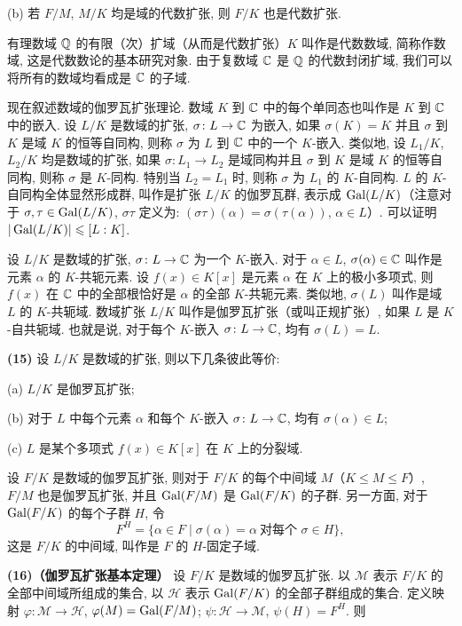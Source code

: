 (b) 若 $F/M$, $M/K$ 均是域的代数扩张, 则 $F/K$ 也是代数扩张.

有理数域 $\mathbb{Q}$ 的有限（次）扩域（从而是代数扩张）$K$ 叫作是代数数域, 简称作数域, 这是代数数论的基本研究对象. 由于复数域 $\mathbb{C}$ 是 $\mathbb{Q}$ 的代数封闭扩域, 我们可以将所有的数域均看成是 $\mathbb{C}$ 的子域.

现在叙述数域的伽罗瓦扩张理论. 数域 $K$ 到 $\mathbb{C}$ 中的每个单同态也叫作是 $K$ 到 $\mathbb{C}$ 中的嵌入. 设 $L/K$ 是数域的扩张, $\sigma\colon L\to\mathbb{C}$ 为嵌入, 如果 $\sigma(K)=K$ 并且 $\sigma$ 到 $K$ 是域 $K$ 的恒等自同构, 则称 $\sigma$ 为 $L$ 到 $\mathbb{C}$ 中的一个 $K$-嵌入. 类似地, 设 $L_1/K$, $L_2/K$ 均是数域的扩张, 如果 $\sigma\colon L_1\to L_2$ 是域同构并且 $\sigma$ 到 $K$ 是域 $K$ 的恒等自同构, 则称 $\sigma$ 是 $K$-同构. 特别当 $L_2=L_1$ 时, 则称 $\sigma$ 为 $L_1$ 的 $K$-自同构. $L$ 的 $K$-自同构全体显然形成群, 叫作是扩张 $L/K$ 的伽罗瓦群, 表示成 $\operatorname{Gal}(L/K)$（注意对于 $\sigma,\tau\in\operatorname{Gal}(L/K)$, $\sigma\tau$ 定义为: $(\sigma\tau)(\alpha)=\sigma(\tau(\alpha))$, $\alpha\in L$）. 可以证明 $|\operatorname{Gal}(L/K)|\leqslant[L:K]$.

设 $L/K$ 是数域的扩张, $\sigma\colon L\to\mathbb{C}$ 为一个 $K$-嵌入. 对于 $\alpha\in L$, $\sigma(\alpha)\in\mathbb{C}$ 叫作是元素 $\alpha$ 的 $K$-共轭元素. 设 $f(x)\in K[x]$ 是元素 $\alpha$ 在 $K$ 上的极小多项式, 则 $f(x)$ 在 $\mathbb{C}$ 中的全部根恰好是 $\alpha$ 的全部 $K$-共轭元素. 类似地, $\sigma(L)$ 叫作是域 $L$ 的 $K$-共轭域. 数域扩张 $L/K$ 叫作是伽罗瓦扩张（或叫正规扩张）, 如果 $L$ 是 $K$-自共轭域. 也就是说, 对于每个 $K$-嵌入 $\sigma\colon L\to\mathbb{C}$, 均有 $\sigma(L)=L$.

\textbf{(15)} 设 $L/K$ 是数域的扩张, 则以下几条彼此等价:

(a) $L/K$ 是伽罗瓦扩张;

(b) 对于 $L$ 中每个元素 $\alpha$ 和每个 $K$-嵌入 $\sigma\colon L\to\mathbb{C}$, 均有 $\sigma(\alpha)\in L$;

(c) $L$ 是某个多项式 $f(x)\in K[x]$ 在 $K$ 上的分裂域.

设 $F/K$ 是数域的伽罗瓦扩张, 则对于 $F/K$ 的每个中间域 $M$（$K\leqslant M\leqslant F$）, $F/M$ 也是伽罗瓦扩张, 并且 $\operatorname{Gal}(F/M)$ 是 $\operatorname{Gal}(F/K)$ 的子群. 另一方面, 对于 $\operatorname{Gal}(F/K)$ 的每个子群 $H$, 令
\[
  F^H=\{\alpha\in F\mid\sigma(\alpha)=\alpha\ \text{对每个 } \sigma\in H\},
\]
这是 $F/K$ 的中间域, 叫作是 $F$ 的 $H$-固定子域.

\textbf{(16)（伽罗瓦扩张基本定理）} 设 $F/K$ 是数域的伽罗瓦扩张. 以 $\mathcal{M}$ 表示 $F/K$ 的全部中间域所组成的集合, 以 $\mathcal{H}$ 表示 $\operatorname{Gal}(F/K)$ 的全部子群组成的集合. 定义映射 $\varphi\colon\mathcal{M}\to\mathcal{H}$, $\varphi(M)=\operatorname{Gal}(F/M)$; $\psi\colon\mathcal{H}\to\mathcal{M}$, $\psi(H)=F^H$. 则

